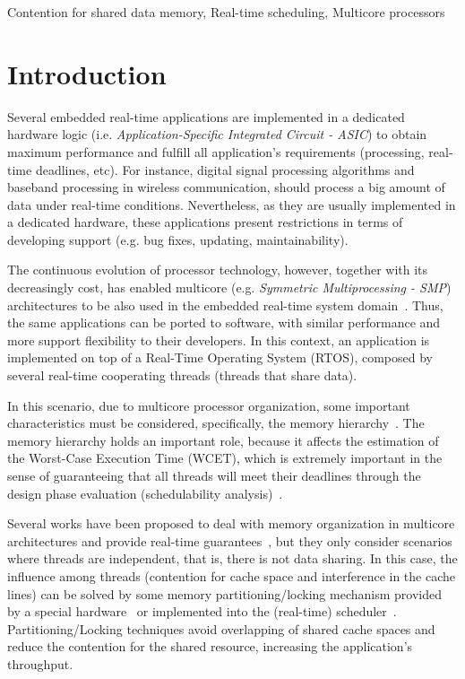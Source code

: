 \documentclass[conference]{IEEEtran}
\begin{document}
\begin{IEEEkeywords}
Contention for shared data memory, Real-time scheduling, Multicore processors
\end{IEEEkeywords}

\section{Introduction}

Several embedded real-time applications are implemented in a dedicated hardware logic (i.e. \textit{Application-Specific Integrated Circuit - ASIC}) to obtain maximum performance and fulfill all application's requirements (processing, real-time deadlines, etc). For instance, digital signal processing algorithms and baseband processing in wireless communication, should process a big amount of data under real-time conditions. Nevertheless, as they are usually implemented in a dedicated hardware, these applications present restrictions in terms of developing support (e.g. bug fixes, updating, maintainability).

The continuous evolution of processor technology, however, together with its decreasingly cost, has enabled multicore (e.g. \textit{Symmetric Multiprocessing - SMP}) architectures to be also used in the embedded real-time system domain~\cite{Cho2006}. Thus, the same applications can be ported to software, with similar performance and more support flexibility to their developers. In this context, an application is implemented on top of a Real-Time Operating System (RTOS), composed by several real-time cooperating threads (threads that share data). 

In this scenario, due to multicore processor organization, some important characteristics must be considered, specifically, the memory hierarchy~\cite{Muralidhara:2010, Zhuravlev:2010}. The memory hierarchy holds an important role, because it affects the estimation of the Worst-Case Execution Time (WCET), which is extremely important in the sense of guaranteeing that all threads will meet their deadlines through the design phase evaluation (schedulability analysis)~\cite{Marwedel2005, Suhendra2008}.

Several works have been proposed to deal with memory organization in multicore architectures and provide real-time guarantees~\cite{Anderson2009a, Anderson2008, Anderson2006, Cho2006}, but they only consider scenarios where threads are independent, that is, there is not data sharing. In this case, the influence among threads (contention for cache space and interference in the cache lines) can be solved by some memory partitioning/locking mechanism provided by a special hardware~\cite{Suhendra2008} or implemented into the (real-time) scheduler~\cite{Guan2009, Zhuravlev:2010}. Partitioning/Locking techniques avoid overlapping of shared cache spaces and reduce the contention for the shared resource, increasing the application's throughput.
\end{document}
